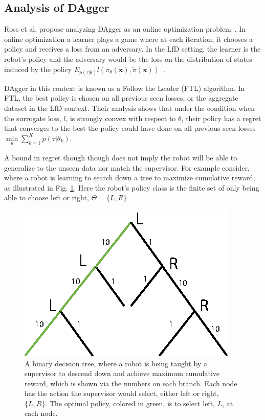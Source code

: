 \documentclass[10pt, conference]{ieeeconf}      %
\newcommand{\bx}{\mathbf{x}}
\begin{document}
\subsection{Analysis of DAgger}
Ross et al. propose analyzing DAgger as an online optimization problem~\cite{ross2010reduction}.  In online optimization a learner plays a game where at each iteration, it chooses a policy and receives a loss from an adversary.  In the LfD setting, the learner is the robot's policy and the adversary would be the loss on the distribution of states induced by the policy $E_{p(\tau|\theta)} l(\pi_{\theta}(\bx),\tilde{\pi}(\bx))$~\cite{shalev2011online}.

DAgger in this context is known as a Follow the Leader (FTL) algorithm. In FTL, the best policy is chosen on all previous seen losses, or the aggregate dataset in the LfD context. Their analysis shows that under the condition when the surrogate loss, $l$, is strongly convex with respect to $\theta$, their policy has a regret that converges to the best the policy could have done on all previous seen losses $\underset{\theta}{\min} \sum_{k=1}^K p(\tau|\theta_k)$. 

A bound in regret though though does not imply the robot will be able to generalize to the unseen data nor match the supervisor. For example consider, where a robot is learning to search down a tree to maximize cumulative reward, as illustrated in Fig. \ref{fig:c_ex}. Here the robot's policy class is the finite set of only being able to choose left or right, $\Theta = \lbrace L,R \rbrace$.

\begin{figure}
\centering
\includegraphics{f_figs/counter_exmp.eps}
\caption{
    \footnotesize
A binary decision tree, where a robot is being taught by a supervisor to descend down and achieve maximum cumulative reward, which is shown via the numbers on each branch. Each node has the action the supervisor would select, either left or right, $\lbrace L, R \rbrace$. The optimal policy, colored in green, is to select left, $L$, at each node.}
\vspace*{-20pt}
\label{fig:c_ex}
\end{figure}
\end{document}
